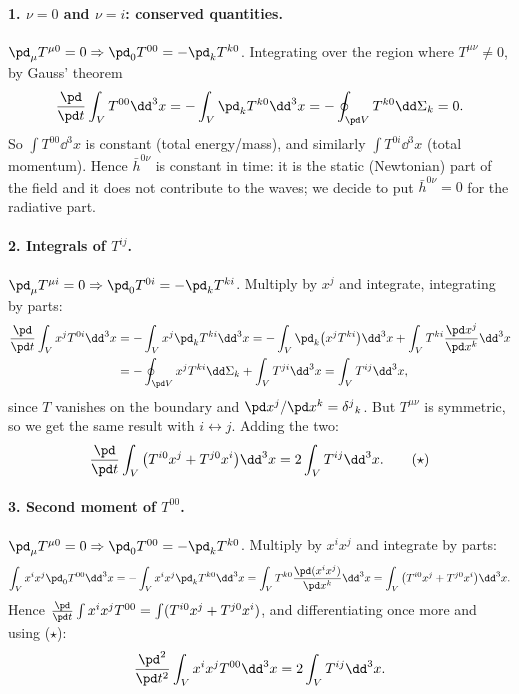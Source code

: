 \paragraph{1. $\nu=0$ and $\nu=i$: conserved quantities.} $\pd_\mu T^{\mu0}=0\Rightarrow\pd_0T^{00}=-\pd_kT^{k0}$. Integrating over the region where $T^{\mu\nu}\neq0$, by Gauss' theorem
\[
  \frac{\pd}{\pd t}\int_VT^{00}\dd^3x=-\int_V\pd_kT^{k0}\dd^3x=-\oint_{\pd V}T^{k0}\dd\Sigma_k=0 .
\]
So $\int T^{00}\dd^3x$ is constant (total energy/mass), and similarly $\int T^{0i}\dd^3x$ (total momentum). Hence $\bar h^{0\nu}$ is constant in time: it is the static (Newtonian) part of the field and it does not contribute to the waves; we decide to put $\bar h^{0\nu}=0$ for the radiative part.

\paragraph{2. Integrals of $T^{ij}$.} $\pd_\mu T^{\mu i}=0\Rightarrow\pd_0T^{0i}=-\pd_kT^{ki}$. Multiply by $x^j$ and integrate, integrating by parts:
\begin{align*}
  \frac{\pd}{\pd t}\int_Vx^jT^{0i}\dd^3x&=-\int_Vx^j\pd_kT^{ki}\dd^3x=-\int_V\pd_k\big(x^jT^{ki}\big)\dd^3x+\int_VT^{ki}\frac{\pd x^j}{\pd x^k}\dd^3x\\
  &=-\oint_{\pd V}x^jT^{ki}\dd\Sigma_k+\int_VT^{ji}\dd^3x=\int_VT^{ij}\dd^3x ,
\end{align*}
since $T$ vanishes on the boundary and $\pd x^j/\pd x^k=\delta^j{}_k$. But $T^{\mu\nu}$ is symmetric, so we get the same result with $i\leftrightarrow j$. Adding the two:
\begin{equation}
  \frac{\pd}{\pd t}\int_V\big(T^{i0}x^j+T^{j0}x^i\big)\dd^3x=2\int_VT^{ij}\dd^3x .\tag{$\star$}
\end{equation}
\paragraph{3. Second moment of $T^{00}$.} $\pd_\mu T^{\mu0}=0\Rightarrow\pd_0T^{00}=-\pd_kT^{k0}$. Multiply by $x^ix^j$ and integrate by parts:
\[
  \int_Vx^ix^j\pd_0T^{00}\dd^3x=-\int_Vx^ix^j\pd_kT^{k0}\dd^3x=\int_VT^{k0}\frac{\pd(x^ix^j)}{\pd x^k}\dd^3x=\int_V\big(T^{i0}x^j+T^{j0}x^i\big)\dd^3x .
\]
Hence $\frac{\pd}{\pd t}\int x^ix^jT^{00}=\int(T^{i0}x^j+T^{j0}x^i)$, and differentiating once more and using ($\star$):
\begin{equation}
  \frac{\pd^2}{\pd t^2}\int_Vx^ix^jT^{00}\dd^3x=2\int_VT^{ij}\dd^3x .
\end{equation}

